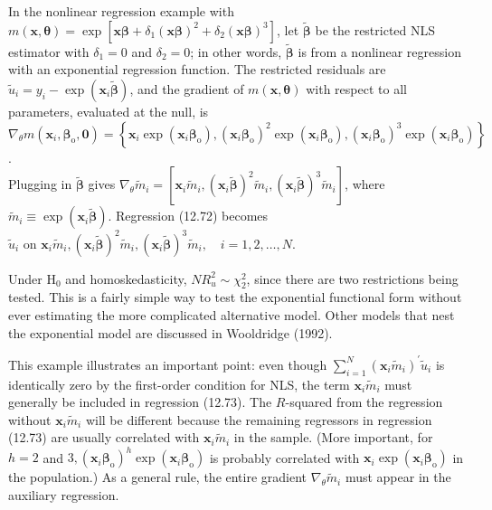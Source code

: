 \documentclass[10pt]{article}
\begin{document}
In the nonlinear regression example with $m(\mathbf{x}, \boldsymbol{\theta})=\exp \left[\mathbf{x} \boldsymbol{\beta}+\delta_{1}(\mathbf{x} \boldsymbol{\beta})^{2}+\delta_{2}(\mathbf{x} \boldsymbol{\beta})^{3}\right]$, let $\tilde{\boldsymbol{\beta}}$ be the restricted NLS estimator with $\delta_{1}=0$ and $\delta_{2}=0$; in other words, $\tilde{\boldsymbol{\beta}}$ is from a nonlinear regression with an exponential regression function. The restricted residuals are $\tilde{u}_{i}=y_{i}-\exp \left(\mathbf{x}_{i} \tilde{\boldsymbol{\beta}}\right)$, and the gradient of $m(\mathbf{x}, \boldsymbol{\theta})$ with respect to all parameters, evaluated at the null, is\\
$\nabla_{\theta} m\left(\mathbf{x}_{i}, \boldsymbol{\beta}_{\mathrm{o}}, \mathbf{0}\right)=\left\{\mathbf{x}_{i} \exp \left(\mathbf{x}_{i} \boldsymbol{\beta}_{\mathrm{o}}\right),\left(\mathbf{x}_{i} \boldsymbol{\beta}_{\mathrm{o}}\right)^{2} \exp \left(\mathbf{x}_{i} \boldsymbol{\beta}_{\mathrm{o}}\right),\left(\mathbf{x}_{i} \boldsymbol{\beta}_{\mathrm{o}}\right)^{3} \exp \left(\mathbf{x}_{i} \boldsymbol{\beta}_{\mathrm{o}}\right)\right\}$.\\
Plugging in $\tilde{\boldsymbol{\beta}}$ gives $\nabla_{\theta} \tilde{m}_{i}=\left[\mathbf{x}_{i} \tilde{m}_{i},\left(\mathbf{x}_{i} \tilde{\boldsymbol{\beta}}\right)^{2} \tilde{m}_{i},\left(\mathbf{x}_{i} \tilde{\boldsymbol{\beta}}\right)^{3} \tilde{m}_{i}\right]$, where $\tilde{m}_{i} \equiv \exp \left(\mathbf{x}_{i} \tilde{\boldsymbol{\beta}}\right)$. Regression (12.72) becomes\\
$\tilde{u}_{i}$ on $\mathbf{x}_{i} \tilde{m}_{i},\left(\mathbf{x}_{i} \tilde{\boldsymbol{\beta}}\right)^{2} \tilde{m}_{i},\left(\mathbf{x}_{i} \tilde{\boldsymbol{\beta}}\right)^{3} \tilde{m}_{i}, \quad i=1,2, \ldots, N$.

Under $\mathrm{H}_{0}$ and homoskedasticity, $N R_{u}^{2} \sim \chi_{2}^{2}$, since there are two restrictions being tested. This is a fairly simple way to test the exponential functional form without ever estimating the more complicated alternative model. Other models that nest the exponential model are discussed in Wooldridge (1992).

This example illustrates an important point: even though $\sum_{i=1}^{N}\left(\mathbf{x}_{i} \tilde{m}_{i}\right)^{\prime} \tilde{u}_{i}$ is identically zero by the first-order condition for NLS, the term $\mathbf{x}_{i} \tilde{m}_{i}$ must generally be included in regression (12.73). The $R$-squared from the regression without $\mathbf{x}_{i} \tilde{m}_{i}$ will be different because the remaining regressors in regression (12.73) are usually correlated with $\mathbf{x}_{i} \tilde{m}_{i}$ in the sample. (More important, for $h=2$ and $3,\left(\mathbf{x}_{i} \boldsymbol{\beta}_{\mathrm{o}}\right)^{h} \exp \left(\mathbf{x}_{i} \boldsymbol{\beta}_{\mathrm{o}}\right)$ is probably correlated with $\mathbf{x}_{i} \exp \left(\mathbf{x}_{i} \boldsymbol{\beta}_{\mathrm{o}}\right)$ in the population.) As a general rule, the entire gradient $\nabla_{\theta} \tilde{m}_{i}$ must appear in the auxiliary regression.
\end{document}
